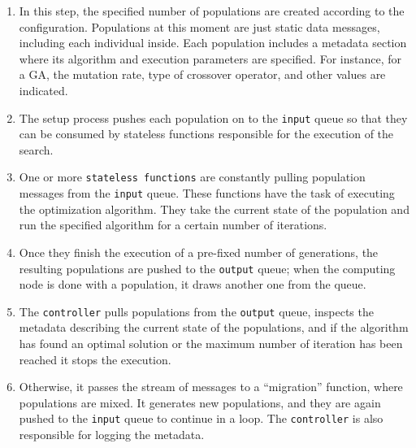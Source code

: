 \documentclass[runningheads]{llncs}
\begin{document}
\begin{enumerate}

\item In this step, the specified number of populations are created according
to the configuration. Populations at this moment are just static data messages,
including each individual inside. Each population includes a metadata section
where its algorithm and execution parameters are specified. For instance, for a
GA, the mutation rate, type of crossover operator, and other values are
indicated.

\item The setup process pushes each population on to the \texttt{input}
queue so that they can be consumed by stateless functions responsible for the
execution of the search.

\item One or more \texttt{stateless functions} are constantly pulling
population messages from the \texttt{input} queue. These functions have the
task of executing the optimization algorithm. They take the current state of
the population and run the specified algorithm for a certain number of
iterations. %

\item Once they finish the execution of a pre-fixed number of
  generations, %
  the resulting populations are pushed to
the \texttt{output} queue; when the computing node is done with a population, it draws another one from the
queue.

\item The \texttt{controller} pulls populations from the \texttt{output} queue,
inspects the metadata describing the current state of the populations, and if
the algorithm has found an optimal solution or the maximum number of iteration
has been reached it stops the execution.

\item Otherwise, it passes the stream of messages to a ``migration'' function,
  where populations are mixed. It generates new populations, %
  and they are
again pushed to the \texttt{input} queue to continue in a loop. The
\texttt{controller} is also responsible for logging the metadata.

\end{enumerate}
\end{document}

